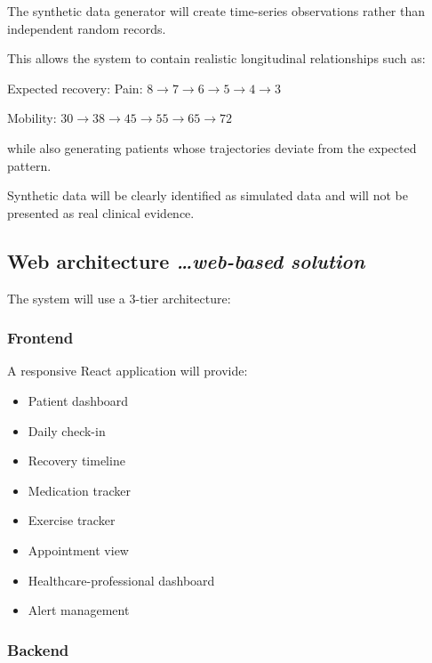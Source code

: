 \documentclass[11pt,a4paper]{article}
\newcommand{\BvrHint}[1]{%
  {\normalfont\normalsize\itshape\hfill #1}}
\begin{document}
The synthetic data generator will create time-series
observations rather than independent random records.

This allows the system to contain realistic longitudinal
relationships such as:

Expected recovery: Pain: $8 \rightarrow 7 \rightarrow 6 \rightarrow 5 \rightarrow 4 \rightarrow 3$

Mobility: $30 \rightarrow 38 \rightarrow 45 \rightarrow 55 \rightarrow 65 \rightarrow 72$

while also generating patients whose trajectories deviate
from the expected pattern.

Synthetic data will be clearly identified as simulated data
and will not be presented as real clinical evidence.

\subsection{Web architecture %
\BvrHint{\ldots web-based solution}}

The system will use a 3-tier architecture:

\subsubsection{Frontend}

A responsive React application will provide:
\begin{itemize}[leftmargin=0.7cm]
    \item Patient dashboard
    \item Daily check-in
    \item Recovery timeline
    \item Medication tracker
    \item Exercise tracker
    \item Appointment view
    \item Healthcare-professional dashboard
    \item Alert management
\end{itemize}

\subsubsection{Backend}
\end{document}
